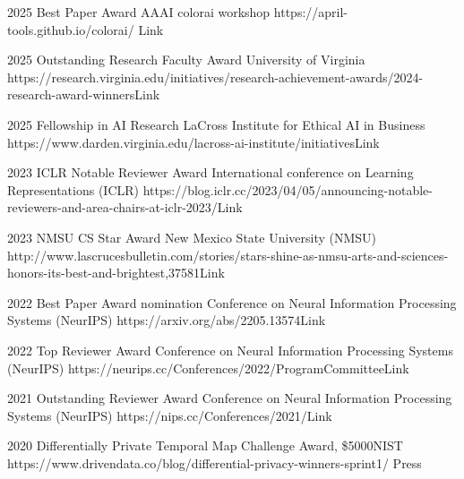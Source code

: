 \begin{awards}
	\awardentry
	{2025}
	{Best Paper Award}
	{AAAI colorai workshop}
	{https://april-tools.github.io/colorai/}
	{Link}

	\awardentry
	{2025}
	{Outstanding Research Faculty Award}
	{University of Virginia}%
	{https://research.virginia.edu/initiatives/research-achievement-awards/2024-research-award-winners}{Link}

	\awardentry
	{2025}
	{Fellowship in AI Research}
	{LaCross Institute for Ethical AI in Business}%
	{https://www.darden.virginia.edu/lacross-ai-institute/initiatives}{Link}

	\awardentry
	{2023}
	{ICLR Notable Reviewer Award}%
	{International conference on Learning Representations (ICLR)}
	{https://blog.iclr.cc/2023/04/05/announcing-notable-reviewers-and-area-chairs-at-iclr-2023/}{Link}

	\awardentry
	{2023}
	{NMSU CS Star Award}%
	{New Mexico State University (NMSU)}
	{http://www.lascrucesbulletin.com/stories/stars-shine-as-nmsu-arts-and-sciences-honors-its-best-and-brightest,37581}{Link}

	\awardentry
	{2022}
	{Best Paper Award nomination}%
	{Conference on Neural Information Processing Systems (NeurIPS)}
	{https://arxiv.org/abs/2205.13574}{Link}

	\awardentry
	{2022}
	{Top Reviewer Award}%
	{Conference on Neural Information Processing Systems (NeurIPS)}
	{https://neurips.cc/Conferences/2022/ProgramCommittee}{Link}

	\awardentry
	{2021}
	{Outstanding Reviewer Award}%
	{Conference on Neural Information Processing Systems (NeurIPS)}
	{https://nips.cc/Conferences/2021/}{Link}

	\awardentry
	{2020}
	{Differentially Private Temporal Map Challenge Award, \$5000}{NIST}
	{https://www.drivendata.co/blog/differential-privacy-winners-sprint1/}
	{Press}


\end{awards}

